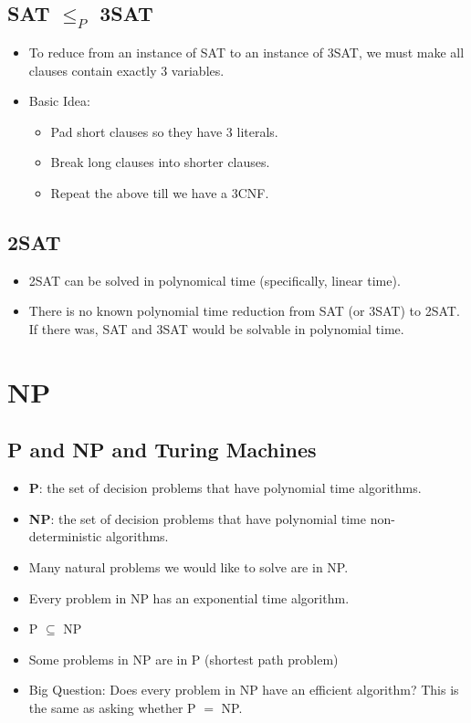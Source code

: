 \subsection{SAT $\leq_P$ 3SAT}
\begin{itemize}
    \item To reduce from an instance of SAT to an instance of 3SAT, we must make all clauses contain exactly 3 variables.
    \item Basic Idea:
    \begin{itemize}
        \item Pad short clauses so they have 3 literals.
        \item Break long clauses into shorter clauses.
        \item Repeat the above till we have a 3CNF.
    \end{itemize}
\end{itemize}

\subsection{2SAT}
\begin{itemize}
    \item 2SAT can be solved in polynomical time (specifically, linear time).
    \item There is no known polynomial time reduction from SAT (or 3SAT) to 2SAT. If there was, SAT and 3SAT would be solvable in polynomial time.
\end{itemize}

\section{NP}

\subsection{P and NP and Turing Machines}
\begin{itemize}
    \item \textbf{P}: the set of decision problems that have polynomial time algorithms.
    \item \textbf{NP}: the set of decision problems that have polynomial time non-deterministic algorithms.
    \item Many natural problems we would like to solve are in NP.
    \item Every problem in NP has an exponential time algorithm.
    \item P $\subseteq$ NP
    \item Some problems in NP are in P (shortest path problem)
    \item Big Question: Does every problem in NP have an efficient algorithm? This is the same as asking whether P $=$ NP.
\end{itemize}

